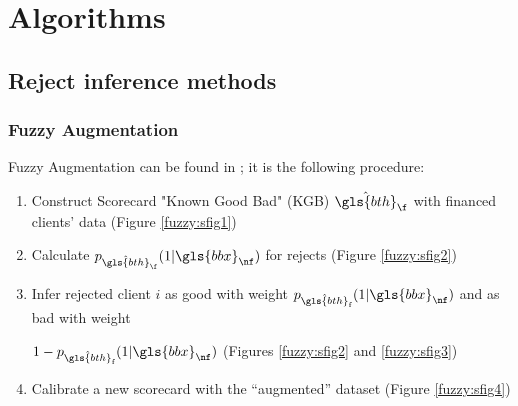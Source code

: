 
\chapter{Algorithms} \label{app1}

\minitoc

\section{Reject inference methods} \label{app1:reject}

\subsection{Fuzzy Augmentation} \label{fuzzy}

Fuzzy Augmentation can be found in \cite{economix}; it is the following procedure:
\begin{enumerate}
\item Construct Scorecard "Known Good Bad" (KGB) $\hat{\gls{bth}}_\f$ with financed clients' data (Figure \ref{fuzzy:sfig1})
\item Calculate $p_{\hat{\gls{bth}}_{\f}}(1|\gls{bbx}_{\nf})$ for rejects (Figure \ref{fuzzy:sfig2})
\item Infer rejected client $i$ as good with weight $p_{\hat{\gls{bth}}_{\text{f}}}(1|\gls{bbx}_{\nf})$ and as bad with weight {\begin{sloppypar} $1-p_{\hat{\gls{bth}}_{\text{f}}}(1|\gls{bbx}_{\nf})$ (Figures \ref{fuzzy:sfig2} and \ref{fuzzy:sfig3}) \end{sloppypar} }
\item Calibrate a new scorecard with the ``augmented'' dataset (Figure \ref{fuzzy:sfig4})
\end{enumerate}

